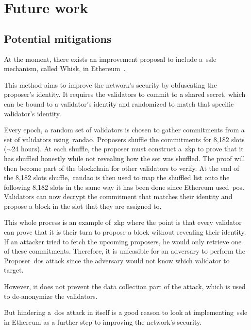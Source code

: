 

\section{Future work}\label{sec:future-works}

\subsection{Potential mitigations}\label{subsec:potential-mitigations}
At the moment, there exists an improvement proposal
to include a~\gls{ssle} mechanism, called Whisk, in Ethereum~\cite{EthereumResearchSSLE2024}.

This method aims to improve the network's security by obfuscating the proposer's identity.
It requires the validators to commit to a shared secret, which can be bound to a validator's identity and randomized to match that specific validator's identity.

Every epoch, a random set of validators is chosen to gather commitments from a set of validators using~\gls{randao}.
Proposers shuffle the commitments for 8,182 slots ($\sim$24 hours).
At each shuffle, the proposer must construct a~\gls{zkp} to prove that it has shuffled honestly while not revealing how the set was shuffled.
The proof will then become part of the blockchain for other validators to verify.
At the end of the 8,182 slots shuffle,~\gls{randao} is then used to map the shuffled list onto the following 8,182 slots in the same way it has been done since Ethereum used~\gls{pos}.
Validators can now decrypt the commitment that matches their identity and propose a block in the slot that they are assigned to.

This whole process is an example of~\gls{zkp} where the point is that every validator can prove that it is their turn to propose a block without revealing their identity.
If an attacker tried to fetch the upcoming proposers, he would only retrieve one of these commitments.
Therefore, it is unfeasible for an adversary to perform the Proposer~\gls{dos} attack since the adversary would not know which validator to target.

However, it does not prevent the data collection part of the attack, which is used to de-anonymize the validators.

But hindering a~\gls{dos} attack in itself is a good reason
to look at implementing~\gls{ssle} in Ethereum as a further step to improving the network's security.


